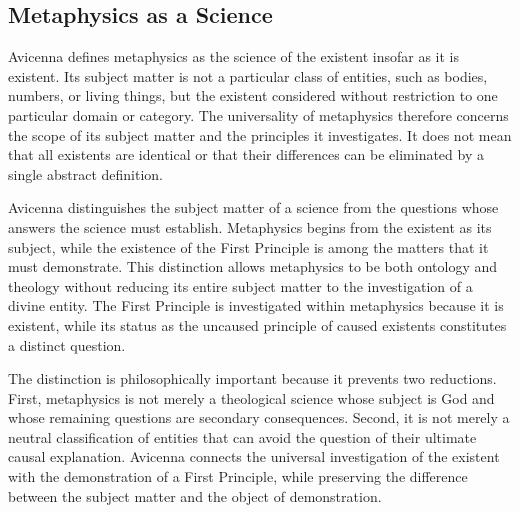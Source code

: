 
\subsection{Metaphysics as a Science}
\label{subsec:ch08-avicenna-metaphysics-science}

\label{para:VS.B01.P01.C08.S13.SS03.P001}

Avicenna defines metaphysics as the science
of the existent insofar as it is existent.
Its subject matter is not a particular
class of entities, such as bodies, numbers,
or living things, but the existent considered
without restriction to one particular
domain or category. The universality of
metaphysics therefore concerns the scope
of its subject matter and the principles
it investigates. It does not mean that
all existents are identical or that their
differences can be eliminated by a single
abstract definition.
\citep[Ilahiyyat, I.1--2]{AvicennaMetaphysics}

\label{para:VS.B01.P01.C08.S13.SS03.P002}

Avicenna distinguishes the subject matter
of a science from the questions whose
answers the science must establish.
Metaphysics begins from the existent as
its subject, while the existence of the
First Principle is among the matters that
it must demonstrate. This distinction
allows metaphysics to be both ontology
and theology without reducing its entire
subject matter to the investigation of
a divine entity. The First Principle is
investigated within metaphysics because
it is existent, while its status as the
uncaused principle of caused existents
constitutes a distinct question.
\citep[Ilahiyyat, I.1--3]{AvicennaMetaphysics}

\label{para:VS.B01.P01.C08.S13.SS03.P003}

The distinction is philosophically important
because it prevents two reductions. First,
metaphysics is not merely a theological
science whose subject is God and whose
remaining questions are secondary
consequences. Second, it is not merely
a neutral classification of entities
that can avoid the question of their
ultimate causal explanation. Avicenna
connects the universal investigation
of the existent with the demonstration
of a First Principle, while preserving
the difference between the subject
matter and the object of demonstration.
\citep[Ilahiyyat, I.1--3]{AvicennaMetaphysics}

